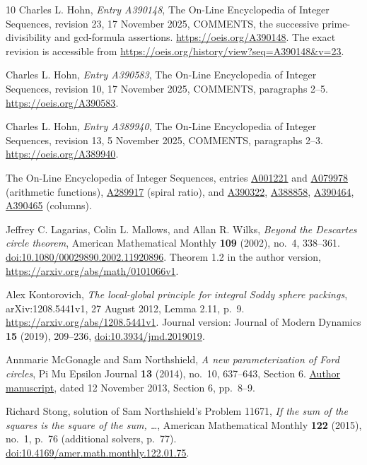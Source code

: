 \documentclass[11pt]{article}
\begin{document}
\begin{thebibliography}{10}
Charles L. Hohn, \emph{Entry A390148}, The On-Line Encyclopedia of Integer Sequences,
revision 23, 17 November 2025, COMMENTS, the successive prime-divisibility
and gcd-formula assertions.
\url{https://oeis.org/A390148}.
The exact revision is accessible from
\url{https://oeis.org/history/view?seq=A390148&v=23}.

Charles L. Hohn, \emph{Entry A390583}, The On-Line Encyclopedia of Integer
Sequences, revision 10, 17 November 2025, COMMENTS, paragraphs 2--5.
\url{https://oeis.org/A390583}.

Charles L. Hohn, \emph{Entry A389940}, The On-Line Encyclopedia of Integer
Sequences, revision 13, 5 November 2025, COMMENTS, paragraphs 2--3.
\url{https://oeis.org/A389940}.

The On-Line Encyclopedia of Integer Sequences, entries
\href{https://oeis.org/A001221}{A001221} and
\href{https://oeis.org/A079978}{A079978} (arithmetic functions),
\href{https://oeis.org/A289917}{A289917} (spiral ratio), and
\href{https://oeis.org/A390322}{A390322},
\href{https://oeis.org/A388858}{A388858},
\href{https://oeis.org/A390464}{A390464},
\href{https://oeis.org/A390465}{A390465} (columns).

Jeffrey C. Lagarias, Colin L. Mallows, and Allan R. Wilks,
\emph{Beyond the Descartes circle theorem},
American Mathematical Monthly \textbf{109} (2002), no.~4, 338--361.
\href{https://doi.org/10.1080/00029890.2002.11920896}{doi:10.1080/00029890.2002.11920896}.
Theorem 1.2 in the author version,
\url{https://arxiv.org/abs/math/0101066v1}.

Alex Kontorovich, \emph{The local-global principle for integral Soddy
sphere packings}, arXiv:1208.5441v1, 27 August 2012, Lemma 2.11,
p.~9. \url{https://arxiv.org/abs/1208.5441v1}.
Journal version: Journal of Modern Dynamics \textbf{15} (2019), 209--236,
\href{https://doi.org/10.3934/jmd.2019019}{doi:10.3934/jmd.2019019}.

Annmarie McGonagle and Sam Northshield,
\emph{A new parameterization of Ford circles}, Pi Mu Epsilon Journal
\textbf{13} (2014), no.~10, 637--643, Section 6.
\href{https://www.researchgate.net/publication/329218164_A_New_Parameterization_of_Ford_Circles}{Author manuscript},
dated 12 November 2013, Section 6, pp.~8--9.

Richard Stong, solution of Sam Northshield's Problem 11671,
\emph{If the sum of the squares is the square of the sum, \ldots},
American Mathematical Monthly \textbf{122} (2015), no.~1, p.~76
(additional solvers, p.~77).
\href{https://doi.org/10.4169/amer.math.monthly.122.01.75}{doi:10.4169/amer.math.monthly.122.01.75}.


\end{thebibliography}
\end{document}
